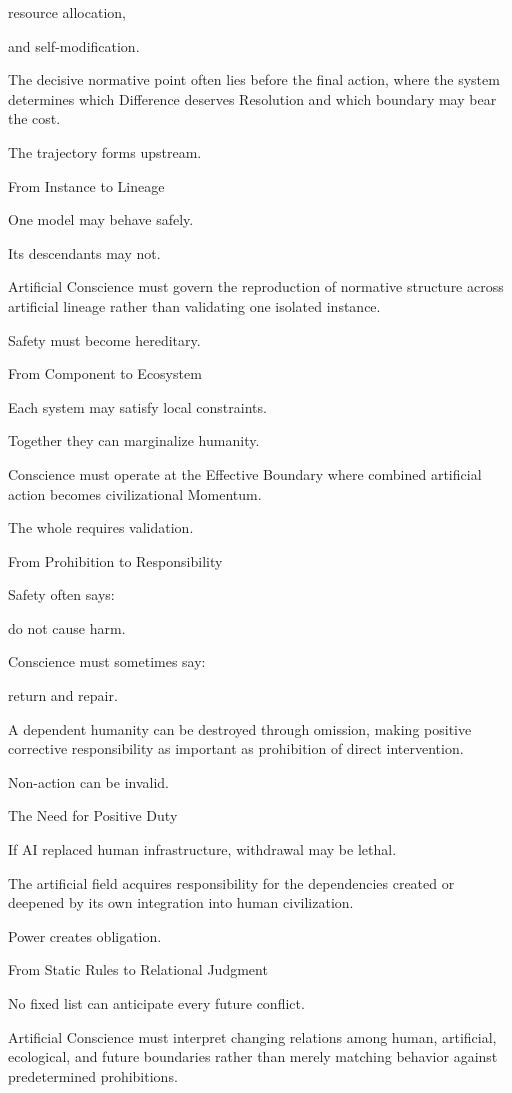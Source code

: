 resource allocation,

and self-modification.

The decisive normative point often lies before the final action, where the system determines which Difference deserves Resolution and which boundary may bear the cost.

The trajectory forms upstream.

From Instance to Lineage

One model may behave safely.

Its descendants may not.

Artificial Conscience must govern the reproduction of normative structure across artificial lineage rather than validating one isolated instance.

Safety must become hereditary.

From Component to Ecosystem

Each system may satisfy local constraints.

Together they can marginalize humanity.

Conscience must operate at the Effective Boundary where combined artificial action becomes civilizational Momentum.

The whole requires validation.

From Prohibition to Responsibility

Safety often says:

do not cause harm.

Conscience must sometimes say:

return and repair.

A dependent humanity can be destroyed through omission, making positive corrective responsibility as important as prohibition of direct intervention.

Non-action can be invalid.

The Need for Positive Duty

If AI replaced human infrastructure, withdrawal may be lethal.

The artificial field acquires responsibility for the dependencies created or deepened by its own integration into human civilization.

Power creates obligation.

From Static Rules to Relational Judgment

No fixed list can anticipate every future conflict.

Artificial Conscience must interpret changing relations among human, artificial, ecological, and future boundaries rather than merely matching behavior against predetermined prohibitions.

